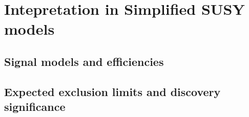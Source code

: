 \section{Intepretation in Simplified SUSY models}
\label{sec:susy}

\subsection{Signal models and efficiencies}
\label{subsec:susy_models}


\subsection{Expected exclusion limits and discovery significance}
\label{subsec:susy_results}


